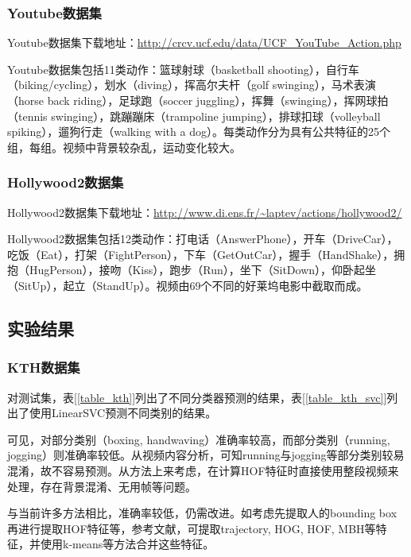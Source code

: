 \documentclass[a4paper, 12pt, UTF8]{article}
\begin{document}
\subsubsection{Youtube数据集}

Youtube数据集下载地址：\url{http://crcv.ucf.edu/data/UCF_YouTube_Action.php}

Youtube数据集包括11类动作：篮球射球（basketball shooting），自行车（biking/cycling），划水（diving），挥高尔夫杆（golf swinging），马术表演（horse back riding），足球跑（soccer juggling），挥舞（swinging），挥网球拍（tennis swinging），跳蹦蹦床（trampoline jumping），排球扣球（volleyball spiking），遛狗行走（walking with a dog）。每类动作分为具有公共特征的25个组，每组。视频中背景较杂乱，运动变化较大。

\subsubsection{Hollywood2数据集}

Hollywood2数据集下载地址：\url{http://www.di.ens.fr/~laptev/actions/hollywood2/}

Hollywood2数据集包括12类动作：打电话（AnswerPhone），开车（DriveCar），吃饭（Eat），打架（FightPerson），下车（GetOutCar），握手（HandShake），拥抱（HugPerson），接吻（Kiss），跑步（Run），坐下（SitDown），仰卧起坐（SitUp），起立（StandUp）。视频由69个不同的好莱坞电影中截取而成。

\subsection{实验结果}

\subsubsection{KTH数据集}

对测试集，表[\ref{table_kth}]列出了不同分类器预测的结果，表[\ref{table_kth_svc}]列出了使用LinearSVC预测不同类别的结果。

可见，对部分类别（boxing, handwaving）准确率较高，而部分类别（running, jogging）则准确率较低。从视频内容分析，可知running与jogging等部分类别较易混淆，故不容易预测。从方法上来考虑，在计算HOF特征时直接使用整段视频来处理，存在背景混淆、无用帧等问题。

与当前许多方法相比，准确率较低，仍需改进。如考虑先提取人的bounding box再进行提取HOF特征等，参考文献\cite{ref9}，可提取trajectory, HOG, HOF, MBH等特征，并使用k-means等方法合并这些特征。
\end{document}
